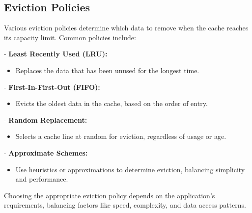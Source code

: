 \subsection{Eviction Policies}
Various eviction policies determine which data to remove when the cache reaches its capacity limit. Common policies include:

- \textbf{Least Recently Used (LRU):} 
\begin{itemize}
\item Replaces the data that has been unused for the longest time.
\end{itemize}

- \textbf{First-In-First-Out (FIFO):} 
\begin{itemize}
\item Evicts the oldest data in the cache, based on the order of entry.
\end{itemize}

- \textbf{Random Replacement:} 
\begin{itemize}
\item Selects a cache line at random for eviction, regardless of usage or age.
\end{itemize}

- \textbf{Approximate Schemes:} 
\begin{itemize}
\item Use heuristics or approximations to determine eviction, balancing simplicity and performance.
\end{itemize}

Choosing the appropriate eviction policy depends on the application's requirements, balancing factors like speed, complexity, and data access patterns.
\newpage
